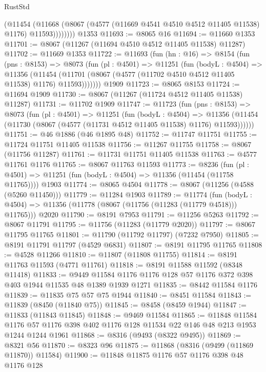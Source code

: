 \begin{lexlean}{RustStd}
\begin{coremodule}
              (@11454
                (@11668 (@8067 (@4577 (@11669 @4541 @4510 @4512 @11405 @11538) @1176) @11593))))))))
    @1353
@11693 := @8065 @16
@11694 := @11660 @1353
@11701 := @8067 (@11267 (@11694 @4510 @4512 @11405 @11538) @11287)
@11702 := @11669 @1353
@11722 := @11693
    (fun (hn : @16) =>
    @8154
      (fun (pns : @8153) =>
      @8073
        (fun (pl : @4501) =>
        @11251
          (fun (bodyL : @4504) =>
          @11356
            (@11454 (@11701 (@8067 (@4577 (@11702 @4510 @4512 @11405 @11538) @1176) @11593)))))))
    @1909
@11723 := @8065 @8153
@11724 := @11694 @1909
@11730 := @8067 (@11267 (@11724 @4512 @11405 @11538) @11287)
@11731 := @11702 @1909
@11747 := @11723
    (fun (pns : @8153) =>
    @8073
      (fun (pl : @4501) =>
      @11251
        (fun (bodyL : @4504) =>
        @11356 (@11454 (@11730 (@8067 (@4577 (@11731 @4512 @11405 @11538) @1176) @11593))))))
@11751 := @46 @1886 (@46 @1895 @48)
@11752 := @11747 @11751
@11755 := @11724 @11751 @11405 @11538
@11756 := @11267 @11755
@11758 := @8067 (@11756 @11287)
@11761 := @11731 @11751 @11405 @11538
@11763 := @4577 @11761 @1176
@11765 := @8067 @11763 @11593
@11773 := @8236
    (fun (pl : @4501) => @11251 (fun (bodyL : @4504) => @11356 (@11454 (@11758 @11765))))
    @1903
@11774 := @8065 @4504
@11778 := @8067 (@11256 (@4588 (@5260 @11450)))
@11779 := @11284 @1903
@11789 := @11774
    (fun (bodyL : @4504) => @11356 (@11778 (@8067 (@11756 (@11283 (@11779 @4518))) @11765)))
    @2020
@11790 := @8191 @7953
@11791 := @11256 @5263
@11792 := @8067 @11791
@11795 := @11756 (@11283 (@11779 @2020))
@11797 := @8067 @11795 @11765
@11801 := @11790 (@11792 @11797) (@7232 @7950)
@11805 := @8191 @11791 @11797 (@4529 @6831)
@11807 := @8191 @11795 @11765
@11808 := @4528 @11266
@11810 := @11807 (@11808 @11755)
@11814 := @8191 @11763 @11593 (@4771 @11761)
@11818 := @8191 @11588 @11592 (@8348 @11418)
@11833 := @9449 @11584 @1176 @1176 @128 @57 @1176 @372 @398 @403 @1944 @11535 @48 @1389 @1939 @1271
@11835 := @8442 @11584 @1176
@11839 := @11835 @75 @57 @75 @1944
@11840 := @8451 @11584
@11843 := @11839 (@8450 (@11840 @75))
@11845 := @8458 (@8459 @1944)
@11847 := @11833 (@11843 @11845)
@11848 := @9469 @11584
@11865 := @11848
    @11584
    @1176
    @57
    @1176
    @398
    @402
    @1176
    @128
    @11534
    @22
    @146
    @48
    @213
    @1953
    @1244
    @1244
    @1961
@11868 := @8316 (@9493 (@8322 @9495))
@11869 := @8321 @56
@11870 := @8323 @96
@11875 := @11868 (@8316 (@9499 (@11869 @11870)) @11584)
@11900 := @11848
    @11875
    @1176
    @57
    @1176
    @398
    @48
    @1176
    @128

\end{coremodule}
\end{lexlean}
